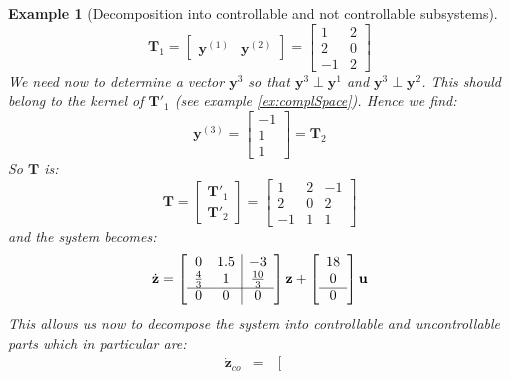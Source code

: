 \documentclass[a4paper,10pt,oneside]{book}
\newtheorem{example}{Example}
\begin{document}
\begin{example}[Decomposition into controllable and not controllable subsystems]
\begin{equation}
 \mathbf{T}_1=\left[{\begin{array}{cc}\mathbf{y}^{(1)}&\mathbf{y}^{(2)}\end{array}}\right]=\left[{\begin{array}{cc}1&2\\2&0\\-1&2\end{array}}\right]
\end{equation}
We need now to determine a vector $\mathbf{y}^{3}$ so that $\mathbf{y}^{3}\perp\mathbf{y}^{1}$ and $\mathbf{y}^{3}\perp\mathbf{y}^{2}$. This should belong to the kernel of $\mathbf{T}'_1$ (see example \ref{ex:complSpace}). Hence we find:
\begin{equation}
 \mathbf{y}^{(3)}=\left[ {\begin{array}{c}
      -1\\1\\1
\end{array} } \right]=\mathbf{T}_2
\end{equation}
So $\mathbf{T}$ is:
\begin{equation}
 \mathbf{T}=\left[ {\begin{array}{c}
      \mathbf{T}'_1\\\mathbf{T}'_2
\end{array} } \right]=\left[ {\begin{array}{ccc}
      1&2&-1\\
      2&0&2\\
      -1&1&1
\end{array} } \right]
\end{equation}
and the system becomes:
\begin{equation}
 \dot{\mathbf{z}}=\left[ {\begin{array}{cc|c}
0 & 1.5 & -3\\
\frac{4}{3} & 1 & \frac{10}{3}\\ \cline{1-3}
0 & 0 & 0
 \end{array} } \right]\mathbf{z} +
\left[ {\begin{array}{c}
18\\
0\\\cline{1-1}
0
 \end{array} } \right]
\mathbf{u}
\end{equation}
This allows us now to decompose the system into controllable and uncontrollable parts which in particular are:
\begin{eqnarray}
  \dot{\mathbf{z}}_{co}&=&\left[ {\begin{array}{cc}

\end{array}}
\end{eqnarray}
\end{example}
\end{document}
